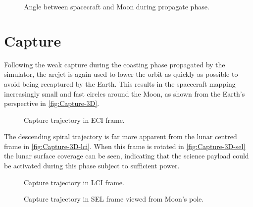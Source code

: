 \begin{figure}
\centering
\def\svgwidth{\figurewidth}

\caption{Angle between spacecraft and Moon during propagate phase.}
\label{fig:Propagate-phase}
\end{figure}


\clearpage

\section{Capture} \label{sec:Capture}

Following the weak capture during the coasting phase propagated by the simulator, the arcjet is again used to lower the orbit as quickly as possible to avoid being recaptured by the Earth. This results in the spacecraft mapping increasingly small and fast circles around the Moon, as shown from the Earth's perspective in \autoref{fig:Capture-3D}.

\begin{figure}
\centering
\def\svgwidth{\figurewidth}

\caption{Capture trajectory in ECI frame.}
\label{fig:Capture-3D}
\end{figure}

The descending spiral trajectory is far more apparent from the lunar centred frame in \autoref{fig:Capture-3D-lci}. When this frame is rotated in \autoref{fig:Capture-3D-sel} the lunar surface coverage can be seen, indicating that the science payload could be activated during this phase subject to sufficient power.

\begin{figure}
\centering
\def\svgwidth{\figurewidth}

\caption{Capture trajectory in LCI frame.}
\label{fig:Capture-3D-lci}
\end{figure}

\begin{figure}
\centering
\def\svgwidth{\figurewidth}

\caption{Capture trajectory in SEL frame viewed from Moon's pole.}
\label{fig:Capture-3D-sel}
\end{figure}

%

